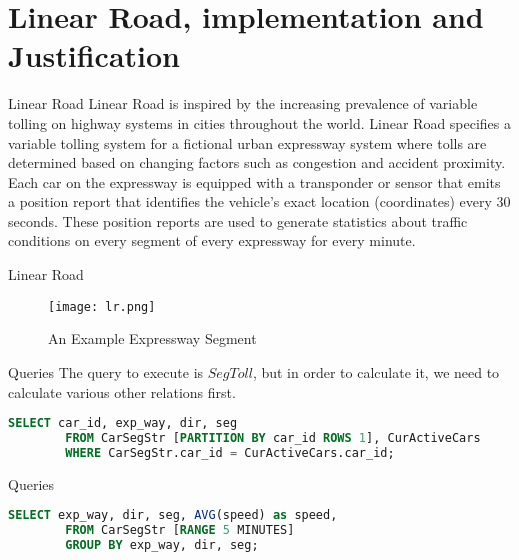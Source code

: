 
\section{Linear Road, implementation and Justification}
\frame{\sectionpage}

\begin{frame}{Linear Road}
Linear Road is inspired by the increasing prevalence of variable tolling on highway systems in cities throughout the world. Linear Road specifies a variable tolling system for a fictional urban expressway system where tolls are determined based on changing factors such as congestion and accident proximity. Each car on the expressway is equipped with a transponder or sensor that emits a position report that identifies the vehicle’s exact location (coordinates) every 30 seconds. These position reports are used to generate statistics about traffic conditions on every segment of every expressway for every minute.
\end{frame}

\begin{frame}{Linear Road}
    \begin{figure}
        \centering
        \texttt{[image: lr.png]}\\
        \caption{An Example Expressway Segment}
        \label{fig:lr_ex}
    \end{figure}
\end{frame}


\begin{frame}[fragile]{Queries}
    The query to execute is $SegToll$, but in order to calculate it, we need to calculate various other relations first.
    \begin{lstlisting}[language=SQL, caption= CurCarSeg linear road query]
        SELECT car_id, exp_way, dir, seg
        FROM CarSegStr [PARTITION BY car_id ROWS 1], CurActiveCars
        WHERE CarSegStr.car_id = CurActiveCars.car_id;
    \end{lstlisting}
\end{frame}

\begin{frame}[fragile]{Queries}    
    \begin{lstlisting}[language=SQL, caption= SEGAVGSPEED linear road query]
        SELECT exp_way, dir, seg, AVG(speed) as speed,
        FROM CarSegStr [RANGE 5 MINUTES]
        GROUP BY exp_way, dir, seg;
    \end{lstlisting}
\end{frame}

